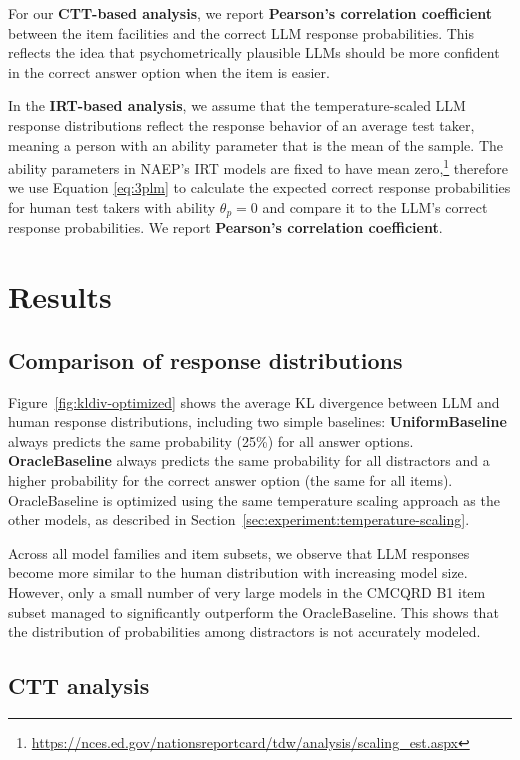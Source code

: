 \documentclass[11pt]{article}
\begin{document}
For our \textbf{CTT-based analysis}, we report \textbf{Pearson's correlation coefficient} between the item facilities and the correct LLM response probabilities. This reflects the idea that psychometrically plausible LLMs should be more confident in the correct answer option when the item is easier.

In the \textbf{IRT-based analysis}, we assume that the temperature-scaled LLM response distributions reflect the response behavior of an average test taker, meaning a person with an ability parameter that is the mean of the sample. The ability parameters in NAEP's IRT models are fixed to have mean zero,\footnote{\url{https://nces.ed.gov/nationsreportcard/tdw/analysis/scaling_est.aspx}} therefore we use Equation \ref{eq:3plm} to calculate the expected correct response probabilities for human test takers with ability $\theta_p = 0$ and compare it to the LLM's correct response probabilities. We report \textbf{Pearson's correlation coefficient}.


\section{Results}

\subsection{Comparison of response distributions}

Figure~\ref{fig:kldiv-optimized} shows the average KL divergence between LLM and human response distributions, including two simple baselines: \textbf{UniformBaseline} always predicts the same probability (25\%) for all answer options. \textbf{OracleBaseline} always predicts the same probability for all distractors and a higher probability for the correct answer option (the same for all items). OracleBaseline is optimized using the same temperature scaling approach as the other models, as described in Section~\ref{sec:experiment:temperature-scaling}.

Across all model families and item subsets, we observe that LLM responses become more similar to the human distribution with increasing model size. However, only a small number of very large models in the CMCQRD B1 item subset managed to significantly outperform the OracleBaseline. This shows that the distribution of probabilities among distractors is not accurately modeled.

\subsection{CTT analysis}
\end{document}
